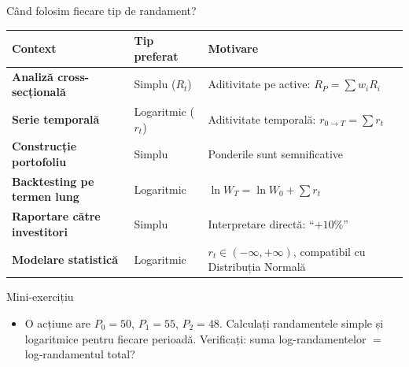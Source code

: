 \documentclass[9pt, aspectratio=169, t]{beamer}
\theoremstyle{definition}
\begin{document}
\begin{frame}{Când folosim fiecare tip de randament?}
\begin{center}
{\small
\renewcommand{\arraystretch}{1.4}
\begin{tabular}{>{\bfseries}lll}
\toprule
\textbf{Context} & \textbf{Tip preferat} & \textbf{Motivare} \\
\midrule
Analiză cross-secțională & Simplu ($R_t$) & Aditivitate pe active: $R_P = \sum w_i R_i$ \\
Serie temporală & Logaritmic ($r_t$) & Aditivitate temporală: $r_{0 \to T} = \sum r_t$ \\
Construcție portofoliu & Simplu & Ponderile sunt semnificative \\
Backtesting pe termen lung & Logaritmic & $\ln W_T = \ln W_0 + \sum r_t$ \\
Raportare către investitori & Simplu & Interpretare directă: ``$+10\%$'' \\
Modelare statistică & Logaritmic & $r_t \in (-\infty, +\infty)$, compatibil cu Distribuția Normală \\
\bottomrule
\end{tabular}
}
\end{center}
\vspace{0.2cm}
\begin{exampleblock}{Mini-exercițiu}
\begin{itemize}\setlength{\itemsep}{0pt}
    \item O acțiune are $P_0 = 50$, $P_1 = 55$, $P_2 = 48$. Calculați randamentele simple și logaritmice pentru fiecare perioadă. Verificați: suma log-randamentelor $=$ log-randamentul total?
\end{itemize}
\end{exampleblock}
\end{frame}
\end{document}
